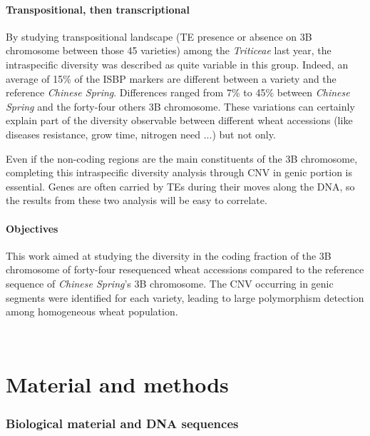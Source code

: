 \documentclass[a4paper, 12pt]{article}
\begin{document}
\begin{onehalfspace}
        \subsection{Transpositional, then transcriptional}

By studying transpositional landscape (TE presence or absence on 3B chromosome between those 45 varieties) among the \textit{Triticeae} last year, the intraspecific diversity was described as quite variable in this group. Indeed, an average of 15\% of the ISBP markers are different between a variety and the reference \textit{Chinese Spring}. Differences ranged from 7\% to 45\% between \textit{Chinese Spring} and the forty-four others 3B chromosome. These variations can certainly explain part of the diversity observable between different wheat accessions (like diseases resistance, grow time, nitrogen need ...) but not only. 

Even if the non-coding regions are the main constituents of the 3B chromosome, completing this intraspecific diversity analysis through CNV in genic portion is essential. Genes are often carried by TEs during their moves along the DNA, so the results from these two analysis will be easy to correlate.

        \subsection{Objectives}

This work aimed at studying the diversity in the coding fraction of the 3B chromosome of forty-four resequenced wheat accessions compared to the reference sequence of \textit{Chinese Spring}'s 3B chromosome. The CNV occurring in genic segments were identified for each variety, leading to large polymorphism detection among homogeneous wheat population.

\newpage %
\thispagestyle{empty}
~
\addtocounter{page}{-1}
\newpage
\clearpage %


\part{Material and methods}
\setcounter{section}{0}

    \section{Biological material and DNA sequences}
    

\end{onehalfspace}
\end{document}
